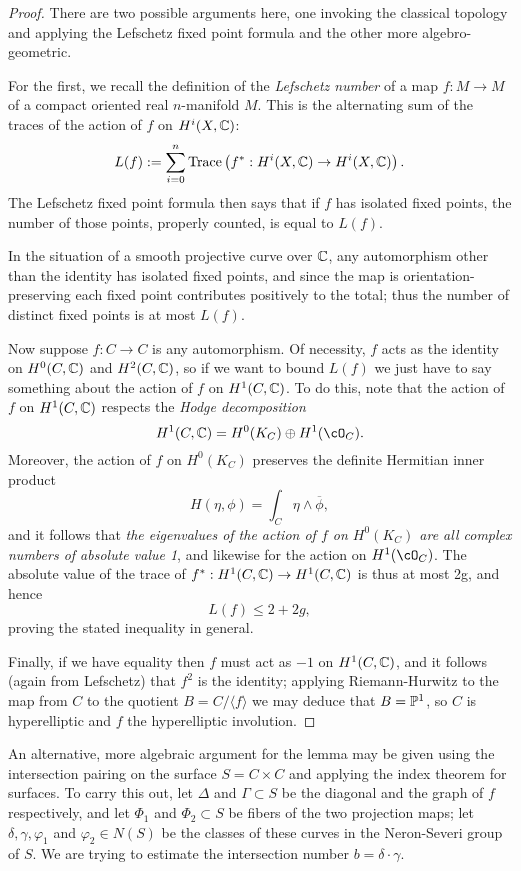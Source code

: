 \begin{proof}
There are two possible arguments here, one invoking the classical topology and applying the Lefschetz fixed point formula and the other more algebro-geometric.

For the first, we recall the definition of the \emph{Lefschetz number} of a map $f : M \to M$ of a compact oriented real $n$-manifold $M$. This is the alternating sum of the traces of the action of $f$ on $H^i(X,\CC)$:
$$
L(f) := \sum_{i=0}^n {\rm Trace}\left(f^* : H^i(X,\CC) \to H^i(X,\CC)\right).
$$
The Lefschetz fixed point formula then says that if $f$ has isolated fixed points, the number of those points, properly counted, is equal to $L(f)$.

In the situation of a smooth projective curve over $\CC$, any automorphism other than the identity has isolated fixed points, and since the map is orientation-preserving  each fixed point contributes positively to the total; thus the number of distinct fixed points is at most $L(f)$.

Now suppose $f: C \to C$ is any automorphism. Of necessity, $f$ acts as the identity on $H^0(C, \CC)$ and $H^2(C, \CC)$, so if we want to bound $L(f)$ we just have to say something about the action of $f$ on $H^1(C,\CC)$. To do this, note that  the action of $f$ on $H^1(C,\CC)$ respects the \emph{Hodge decomposition}
$$
H^1(C,\CC)  = H^0(K_C) \oplus H^1(\cO_C).
$$  
Moreover, the action of $f$ on $H^0(K_C)$ preserves the definite Hermitian inner product
$$
H(\eta, \phi) = \int_C \eta \wedge \overline \phi,
$$
and it follows that \emph{the eigenvalues of the action of $f$ on $H^0(K_C)$ are all complex numbers of absolute value 1}, and likewise for the action on $H^1(\cO_C)$. The absolute value of the trace of $f^*: H^1(C,\CC) \to H^1(C,\CC)$ is thus at most 2g, and hence
$$
L(f) \leq 2 + 2g,
$$
proving the stated inequality in general.

Finally, if we have equality then $f$ must act as $-1$ on $H^1(C,\CC)$, and it follows (again from Lefschetz) that $f^2$ is the identity; applying Riemann-Hurwitz to the map from $C$ to the quotient $B = C/\langle f \rangle$ we may deduce that $B = \PP^1$, so $C$ is hyperelliptic and $f$ the hyperelliptic involution.
\end{proof}

An alternative, more algebraic argument for the lemma may be given using the intersection pairing on the surface $S = C \times C$ and applying the index theorem for surfaces. To carry this out, let $\Delta$ and $\Gamma \subset S$ be the diagonal and the graph of $f$ respectively, and let $\Phi_1$ and $\Phi_2 \subset S$ be fibers of the two projection maps; let $\delta, \gamma, \varphi_1$ and $\varphi_2 \in N(S)$ be the classes of these curves in the Neron-Severi group of $S$. We are trying to estimate the intersection number $b = \delta \cdot \gamma$. 

